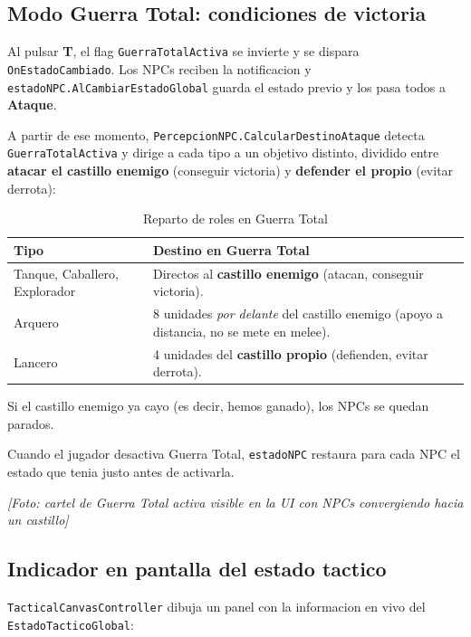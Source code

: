 \documentclass[12pt,a4paper]{article}
\newcommand{\fotoplaceholder}[1]{%
    \par\medskip\noindent%
    \begin{center}%
    \begin{tcolorbox}[
        colback=fotobg,
        colframe=fotoborder,
        boxrule=0.8pt,
        arc=2pt,
        width=0.85\textwidth,
        halign=center,
        valign=center,
        height=2.4cm
    ]
    \itshape\color{gray} [Foto: #1]
    \end{tcolorbox}%
    \end{center}\medskip%
}
\begin{document}
\subsection{Modo Guerra Total: condiciones de victoria}

Al pulsar \textbf{T}, el flag \texttt{GuerraTotalActiva} se invierte y
se dispara \texttt{OnEstadoCambiado}. Los NPCs reciben la notificacion
y \texttt{estadoNPC.AlCambiarEstadoGlobal} guarda el estado previo y
los pasa todos a \textbf{Ataque}.

A partir de ese momento, \texttt{PercepcionNPC.CalcularDestinoAtaque}
detecta \texttt{GuerraTotalActiva} y dirige a cada tipo a un objetivo
distinto, dividido entre \textbf{atacar el castillo enemigo} (conseguir
victoria) y \textbf{defender el propio} (evitar derrota):

\begin{table}[H]
\centering
\caption{Reparto de roles en Guerra Total}
\label{tab:guerratotal}
\renewcommand{\arraystretch}{1.2}
\begin{tabularx}{\textwidth}{l X}
\toprule
\textbf{Tipo} & \textbf{Destino en Guerra Total} \\
\midrule
Tanque, Caballero, Explorador & Directos al \textbf{castillo enemigo} (atacan, conseguir victoria). \\
Arquero & 8 unidades \emph{por delante} del castillo enemigo (apoyo a distancia, no se mete en melee). \\
Lancero & 4 unidades del \textbf{castillo propio} (defienden, evitar derrota). \\
\bottomrule
\end{tabularx}
\end{table}

Si el castillo enemigo ya cayo (es decir, hemos ganado), los NPCs se
quedan parados.

Cuando el jugador desactiva Guerra Total, \texttt{estadoNPC} restaura
para cada NPC el estado que tenia justo antes de activarla.

\fotoplaceholder{cartel de Guerra Total activa visible en la UI con NPCs convergiendo hacia un castillo}

\subsection{Indicador en pantalla del estado tactico}

\texttt{TacticalCanvasController} dibuja un panel con la informacion
en vivo del \texttt{EstadoTacticoGlobal}:
\end{document}
